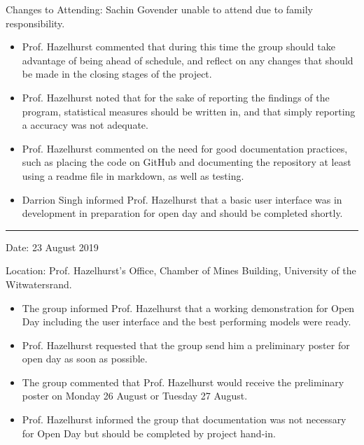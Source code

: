 \documentclass[conference, onecolumn]{IEEEtran}
\begin{document}
Changes to Attending: Sachin Govender unable to attend due to family responsibility.
\begin{itemize}
	\item Prof. Hazelhurst commented that during this time the group should take advantage of being ahead of schedule, and reflect on any changes that should be made in the closing stages of the project.
	\item Prof. Hazelhurst noted that for the sake of reporting the findings of the program, statistical measures should be written in, and that simply reporting a accuracy was not adequate.
	\item Prof. Hazelhurst commented on the need for good documentation practices, such as placing the code on GitHub and documenting the repository at least using a readme file in markdown, as well as testing.
	\item Darrion Singh informed Prof. Hazelhurst that a basic user interface was in development in preparation for open day and should be completed shortly.
\end{itemize}

\rule{\linewidth}{2pt}

Date: 23 August 2019

Location: Prof. Hazelhurst's Office, Chamber of Mines Building, University of the Witwatersrand.
\begin{itemize}
	\item The group informed Prof. Hazelhurst that a working demonstration for Open Day including the user interface and the best performing models were ready.
	\item Prof. Hazelhurst requested that the group send him a preliminary poster for open day as soon as possible.
	\item The group commented that Prof. Hazelhurst would receive the preliminary poster on Monday 26 August or Tuesday 27 August.
	\item Prof. Hazelhurst informed the group that documentation was not necessary for Open Day but should be completed by project hand-in.
\end{itemize}
\end{document}
